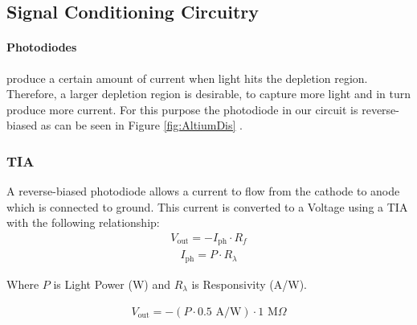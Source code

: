 \subsection{Signal Conditioning Circuitry} %
\label{subsec:SignalConditioningCircuitry}

\paragraph{Photodiodes} produce a certain amount of current when light hits the depletion region. Therefore, a larger depletion region is desirable, to capture more light and in turn produce more current. For this purpose the photodiode in our circuit is reverse-biased as can be seen in Figure \ref{fig:AltiumDis} \cite[p.155]{RefWorks:keiser2021fiber}. 

%
\subsubsection{\acf{TIA}}
A reverse-biased photodiode allows a current to flow from the cathode to anode which is connected to ground. This current is converted to a Voltage using a \ac{TIA} with the following relationship:
\begin{equation} \label{eq:TIAoutput} %
  \begin{split}
  V_{\text{out}} = - I_{\text{ph}} \cdot R_f
  \end{split}
\end{equation}
\begin{equation} \label{eq:Photocurrent} %
  \begin{split}
  I_{\text{ph}} = P \cdot R_{\lambda}
  \end{split}
\end{equation}

Where $P$ is Light Power (W) and $R_{\lambda}$ is Responsivity (A/W).

\begin{equation} \label{eq:TIAoutputWithValues}
  \begin{split}
  V_{\text{out}} = -(P \cdot 0.5 \text{ A/W}) \cdot 1 \text{ M}\Omega
  \end{split}
\end{equation}

